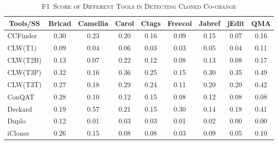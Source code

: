 \documentclass[review]{elsarticle}
\begin{document}
\begin{table}[htbp]
\centering
\addtolength{\tabcolsep}{-4pt}
\caption{\textsc{F1~Score of Different Tools in Detecting Cloned Co-change}}
\label{tab:detection-f1-score}
\begin{tabular}{|l|c|c|c|c|c|c|c|c|}
\hline
\multicolumn{1}{|c|}{\textbf{Tools/SS}} & \textbf{Brlcad} & \textbf{Camellia} & \textbf{Carol} & \textbf{Ctags} & \textbf{Freecol} & \textbf{Jabref} & \textbf{jEdit} & \textbf{QMA} \\ \hline \hline
CCFinder                                & 0.30            & 0.23              & 0.20           & 0.16           & 0.09             & 0.15            & 0.07           & 0.16         \\ \hline
CLW(T1)                                 & 0.09            & 0.04              & 0.06           & 0.03           & 0.03             & 0.05            & 0.04           & 0.11         \\ \hline
CLW(T2B)                            & 0.13            & 0.07              & 0.22           & 0.12           & 0.08             & 0.13            & 0.08           & 0.17         \\ \hline
CLW(T3P)                          & 0.32            & 0.16              & 0.36           & 0.25           & 0.15             & 0.30            & 0.35           & 0.49         \\ \hline
CLW(T3T)                            & 0.27            & 0.18              & 0.29           & 0.24           & 0.11             & 0.20            & 0.20           & 0.42         \\ \hline
ConQAT                                  & 0.28            & 0.10              & 0.12           & 0.15           & 0.08             & 0.12            & 0.08           & 0.08         \\ \hline
Deckard                                 & 0.19            & 0.57              & 0.21           & 0.15           & 0.30             & 0.14            & 0.18           & 0.41         \\ \hline
Duplo                                   & 0.12            & 0.01              & 0.03           & 0.03           & 0.01             & 0.02            & 0.00           & 0.00         \\ \hline
iClones                                 & 0.26            & 0.15              & 0.08           & 0.08           & 0.03             & 0.09            & 0.05           & 0.10         \\ \hline

\end{tabular}
\end{table}
\end{document}

